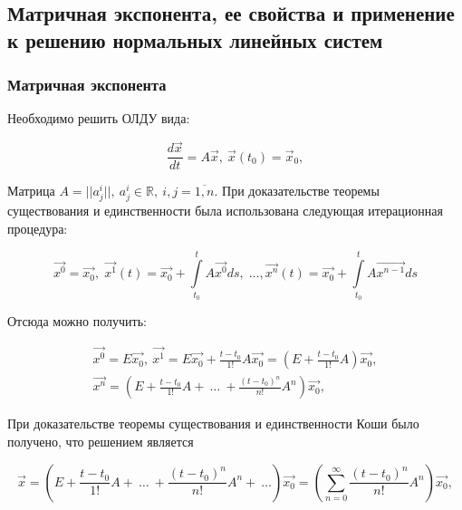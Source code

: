 \subsection{Матричная экспонента, ее свойства и применение к решению нормальных линейных систем}

\subsubsection{Матричная экспонента}
Необходимо решить ОЛДУ вида:

\begin{equation}
    \frac{d\overrightarrow{x}}{dt} = A\overrightarrow{x},\ \overrightarrow{x}(t_0) = \overrightarrow{x}_0,
    \label{Issue5_1}
\end{equation}

Матрица $A = ||a_j^i||,\ a_j^i \in \mathds{R},\ i, j = \overline{1,n}$. При доказательстве теоремы существования и единственности была использована следующая итерационная процедура:

\begin{equation*}
    \overrightarrow{x^{0}} = \overrightarrow{x_{0}}, \; \overrightarrow{x^{1}}(t) = \overrightarrow{x_{0}} + \int \limits_{t_0}^{t} A \overrightarrow{x^{0}} ds, \; \dots, \overrightarrow{x^{n}}(t) = \overrightarrow{x_{0}} + \int \limits_{t_0}^{t} A \overrightarrow{x^{n - 1}} ds
\end{equation*}

Отсюда можно получить:

\begin{equation*}
    \begin{gathered}
        \overrightarrow{x^{0}} = E\overrightarrow{x_0},\ \overrightarrow{x^1} = E\overrightarrow{x_0} + \frac{t-t_0}{1!}A\overrightarrow{x_0} = \left(E + \frac{t-t_0}{1!}A\right) \overrightarrow{x_0}, \\  
        \overrightarrow{x^n} = \left(E + \frac{t-t_0}{1!}A +\ \dots\ + \frac{(t-t_0)^n}{n!}A^n\right)\overrightarrow{x_0},	 
    \end{gathered}
\end{equation*}

При доказательстве теоремы существования и единственности Коши было получено, что решением является

\begin{equation*}
    \overrightarrow{x} = \left(E + \frac{t-t_0}{1!}A +\ \dots\ + \frac{(t-t_0)^n}{n!}A^n+\ \dots \right)\overrightarrow{x_0} = \left(\sum\limits_{n = 0}^{\infty} \frac{(t-t_0)^n}{n!}A^n\right)\overrightarrow{x_0},	 
\end{equation*}

